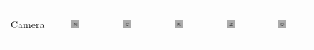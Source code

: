 
\begin{figure}[!t]
	\centering

	\begin{tabular}{@{}r@{ } c@{ } c@{ } c@{ } c@{ } c }

	\begin{sideways} \parbox[b]{20mm} {Camera} \end{sideways} &
	\includegraphics[width=0.185\textwidth]{__Images/05/WB_20-200_-2@90/wb_N_20-200_Camera-2,00D@90(lens).png} &
	\includegraphics[width=0.185\textwidth]{__Images/05/WB_20-200_-2@90/wb_C_20-200_Camera-2,00D@90(lens).png} &
	\includegraphics[width=0.185\textwidth]{__Images/05/WB_20-200_-2@90/wb_K_20-200_Camera-2,00D@90(lens).png} &
	\includegraphics[width=0.185\textwidth]{__Images/05/WB_20-200_-2@90/wb_Z_20-200_Camera-2,00D@90(lens).png} &
	\includegraphics[width=0.185\textwidth]{__Images/05/WB_20-200_-2@90/wb_O_20-200_Camera-2,00D@90(lens).png} \\


\end{tabular}
\end{figure}
